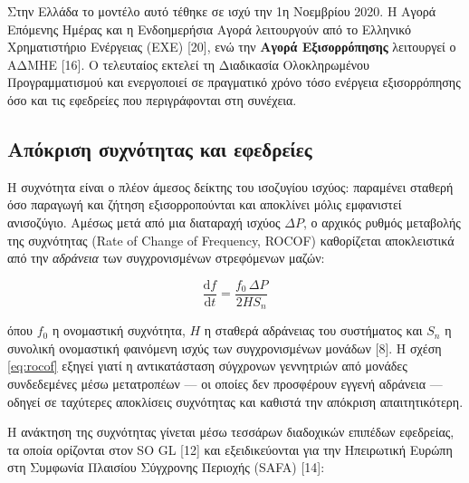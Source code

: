 Στην Ελλάδα το μοντέλο αυτό τέθηκε σε ισχύ την 1η Νοεμβρίου 2020. Η Αγορά Επόμενης Ημέρας και η
Ενδοημερήσια Αγορά λειτουργούν από το Ελληνικό Χρηματιστήριο Ενέργειας (ΕΧΕ) [20], ενώ την
\textbf{Αγορά Εξισορρόπησης} λειτουργεί ο ΑΔΜΗΕ [16]. Ο τελευταίος εκτελεί τη Διαδικασία
Ολοκληρωμένου Προγραμματισμού και ενεργοποιεί σε πραγματικό χρόνο τόσο ενέργεια εξισορρόπησης όσο
και τις εφεδρείες που περιγράφονται στη συνέχεια.

\subsection{Απόκριση συχνότητας και εφεδρείες}

Η συχνότητα είναι ο πλέον άμεσος δείκτης του ισοζυγίου ισχύος: παραμένει σταθερή όσο παραγωγή και
ζήτηση εξισορροπούνται και αποκλίνει μόλις εμφανιστεί ανισοζύγιο. Αμέσως μετά από μια διαταραχή
ισχύος $\Delta P$, ο αρχικός ρυθμός μεταβολής της συχνότητας (Rate of Change of Frequency, ROCOF)
καθορίζεται αποκλειστικά από την \emph{αδράνεια} των συγχρονισμένων στρεφόμενων μαζών:

\begin{equation}
\frac{\mathrm{d}f}{\mathrm{d}t} = \frac{f_0 \, \Delta P}{2 H S_n}
\label{eq:rocof}
\end{equation}

όπου $f_0$ η ονομαστική συχνότητα, $H$ η σταθερά αδράνειας του συστήματος και $S_n$ η συνολική
ονομαστική φαινόμενη ισχύς των συγχρονισμένων μονάδων [8]. Η σχέση \eqref{eq:rocof} εξηγεί γιατί η
αντικατάσταση σύγχρονων γεννητριών από μονάδες συνδεδεμένες μέσω μετατροπέων — οι οποίες δεν
προσφέρουν εγγενή αδράνεια — οδηγεί σε ταχύτερες αποκλίσεις συχνότητας και καθιστά την απόκριση
απαιτητικότερη.

Η ανάκτηση της συχνότητας γίνεται μέσω τεσσάρων διαδοχικών επιπέδων εφεδρείας, τα οποία ορίζονται
στον SO GL [12] και εξειδικεύονται για την Ηπειρωτική Ευρώπη στη Συμφωνία Πλαισίου Σύγχρονης
Περιοχής (SAFA) [14]:

